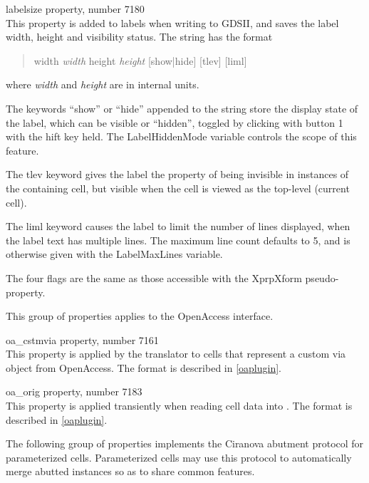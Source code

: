 \begin{description}
\item{\et labelsize} property, number 7180\\
This property is added to labels when writing to GDSII, and saves the
label width, height and visibility status.  The string has the format
\begin{quote}
{\vt width} {\it width} {\vt height} {\it height} [{\vt show}|{\vt hide}]
 [{\vt tlev}] [{\vt liml}]
\end{quote}
where {\it width} and {\it height} are in internal units.

The keywords ``{\vt show}'' or ``{\vt hide}'' appended to the string
store the display state of the label, which can be visible or
``hidden'', toggled by clicking with button 1 with the {\kb hift} key
held.  The {\et LabelHiddenMode} variable controls the scope of this
feature.

The {\vt tlev} keyword gives the label the property of being invisible
in instances of the containing cell, but visible when the cell is
viewed as the top-level (current cell).

The {\vt liml} keyword causes the label to limit the number of lines
displayed, when the label text has multiple lines.  The maximum line
count defaults to 5, and is otherwise given with the {\vt
LabelMaxLines} variable.

The four flags are the same as those accessible with the {\et
XprpXform} pseudo-property.
\end{description}

This group of properties applies to the OpenAccess interface.

\begin{description}
\item{\et oa\_cstmvia} property, number 7161\\
This property is applied by the translator to {\Xic} cells that
represent a custom via object from OpenAccess.  The format is
described in \ref{oaplugin}.

\item{\et oa\_orig} property, number 7183\\
This property is applied transiently when reading cell data into
{\Xic}.  The format is described in \ref{oaplugin}.
\end{description}

The following group of properties implements the Ciranova abutment
protocol for parameterized cells.  Parameterized cells may use this
protocol to automatically merge abutted instances so as to share
common features.

